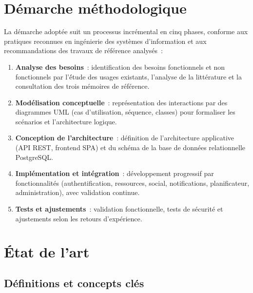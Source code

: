 \documentclass[12pt,a4paper,oneside]{report}
\begin{document}
\section{D\'emarche m\'ethodologique}
\label{sec:methodo}

La d\'emarche adopt\'ee suit un processus incr\'emental en cinq phases, conforme aux pratiques reconnues en ing\'enierie des syst\`emes d'information et aux recommandations des travaux de r\'ef\'erence analys\'es~:

\begin{enumerate}
  \item \textbf{Analyse des besoins}~: identification des besoins fonctionnels et non fonctionnels par l'\'étude des usages existants, l'analyse de la litt\'erature et la consultation des trois m\'emoires de r\'ef\'erence.
  \item \textbf{Mod\'elisation conceptuelle}~: repr\'esentation des interactions par des diagrammes UML (cas d'utilisation, s\'equence, classes) pour formaliser les sc\'enarios et l'architecture logique.
  \item \textbf{Conception de l'architecture}~: d\'efinition de l'architecture applicative (API REST, frontend SPA) et du sch\'ema de la base de donn\'ees relationnelle PostgreSQL.
  \item \textbf{Impl\'ementation et int\'egration}~: d\'eveloppement progressif par fonctionnalit\'es (authentification, ressources, social, notifications, planificateur, administration), avec validation continue.
  \item \textbf{Tests et ajustements}~: validation fonctionnelle, tests de s\'ecurit\'e et ajustements selon les retours d'exp\'erience.
\end{enumerate}

\section{\'Etat de l'art}
\label{sec:etat_art}

\subsection{D\'efinitions et concepts cl\'es}
\end{document}
